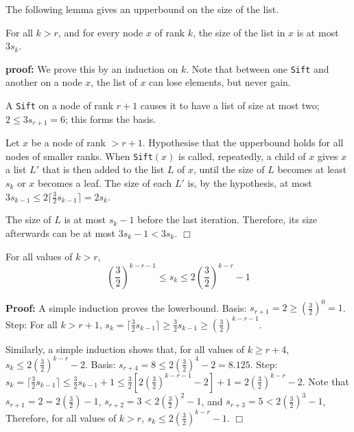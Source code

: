 The following lemma gives an upperbound on the size of the list.

\begin{lemma}
\label{lem:3sk}
For all $k>r$, and for every node $x$ of rank $k$, 
the size of the list in $x$ is at most $3 s_k$.
\end{lemma}
{\bf proof:}
We prove this by an induction on $k$.
Note that between one {\tt Sift} and another on a node $x$, the list of $x$ can
lose elements, but never gain.  

A {\tt Sift} on a node of rank $r+1$ causes it to have a list of size at most two;
$2\leq 3s_{r+1}=6$; this forms the basis. 

Let $x$ be a node of rank $ > r + 1$. Hypothesise that the upperbound
holds for all nodes of smaller ranks. When {\tt Sift}$(x)$ is called,
repeatedly, a child of $x$ gives $x$ a list $L'$ that is then added to the list $L$ of $x$,
until the size of $L$ becomes at least $s_{k}$ or $x$ becomes a leaf.
The size of each $L'$ is, by the hypothesis, at most $3 s_{k-1} \leq
2\lceil\frac{3}{2}s_{k-1}\rceil =2s_{k}$.




The size of $L$ is at most $s_k - 1$ before the last iteration.
Therefore, its size afterwards can be at most $3 s_k -1 < 3 s_k$. 
\hfill $\Box$


\begin{lemma}
\label{lem:skbounds}
For all values of $k > r$,
\begin{equation*}
\left(\frac{3}{2}\right)^{k - r -1} \leq s_k \leq 2 \left(\frac{3}{2}\right)^{k - r} - 1
\end{equation*}
\end{lemma}

{\bf Proof:}
A simple induction proves the lowerbound. 
Basis: $s_{r+1}=2\geq\left(\frac{3}{2}\right)^{0}=1$.
Step: For all $k>r+1$, $s_{k}=\lceil \frac{3}{2} s_{k-1} \rceil\geq\frac{3}{2} s_{k-1}\geq\left(\frac{3}{2}\right)^{k - r -1}$.

Similarly, a simple induction shows that, 
for all values of $k \geq r+4$, $s_k \leq 2 \left(\frac{3}{2}\right)^{k - r} - 2$.
Basis: $s_{r+4}=8\leq 2\left(\frac{3}{2}\right)^{4} - 2=8.125$.
Step: $s_{k}=\lceil \frac{3}{2} s_{k-1} \rceil\leq\frac{3}{2} s_{k-1}+1\leq
	\frac{3}{2}\left[2\left(\frac{3}{2}\right)^{k - r -1}-2\right]+1=2 \left(\frac{3}{2}\right)^{k - r} - 2$.
Note that
$s_{r+1}=2=2\left(\frac{3}{2}\right)-1$,
$s_{r+2}=3<2\left(\frac{3}{2}\right)^{2}-1$, and
$s_{r+3}=5<2\left(\frac{3}{2}\right)^{3}-1$,
Therefore, for all values of $k > r$, $s_k \leq 2 \left(\frac{3}{2}\right)^{k - r} - 1$.
 \hfill $\Box$



